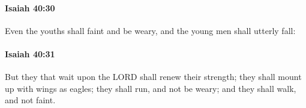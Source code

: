 		\paragraph{Isaiah 40:30} %
			\label{ISAIAH-40-30}

			Even the youths shall faint and be weary, and the young men shall utterly fall:


		\paragraph{Isaiah 40:31} %
			\label{ISAIAH-40-31}

			But they that wait upon the LORD shall renew their strength; they shall mount up with wings as eagles; they shall run, and not be weary; and they shall walk, and not faint.

